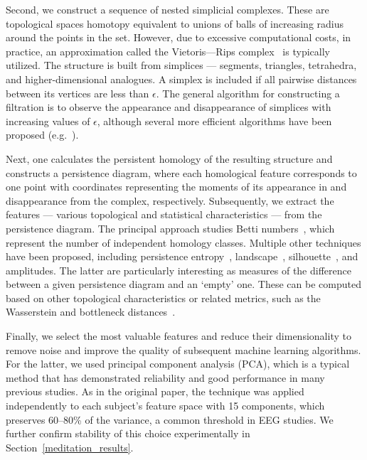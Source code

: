 \documentclass[pdflatex,sn-basic,Numbered]{sn-jnl}
\begin{document}
Second, we construct a sequence of nested simplicial complexes. These are topological spaces homotopy equivalent to unions of balls of increasing radius around the points in the set. However, due to excessive computational costs, in practice, an approximation called the Vietoris---Rips complex~\cite{Vietoris1927} is typically utilized. The structure is built from simplices --- segments, triangles, tetrahedra, and higher-dimensional analogues. A simplex is included if all pairwise distances between its vertices are less than $\epsilon$. The general algorithm for constructing a filtration is to observe the appearance and disappearance of simplices with increasing values of $\epsilon$, although several more efficient algorithms have been proposed (e.g.~\cite{Bauer_2021}).

Next, one calculates the persistent homology of the resulting structure and constructs a persistence diagram, where each homological feature corresponds to one point with coordinates representing the moments of its appearance in and disappearance from the complex, respectively. Subsequently, we extract the features --- various topological and statistical characteristics --- from the persistence diagram. The principal approach studies Betti numbers~\cite{Zomorodian2005}, which represent the number of independent homology classes. Multiple other techniques have been proposed, including persistence entropy~\cite{10.1007/978-3-319-29228-1_11}, landscape~\cite{bubenik2015statisticaltopologicaldataanalysis}, silhouette~\cite{chazal2013stochasticconvergencepersistencelandscapes}, and amplitudes. The latter are particularly interesting as measures of the difference between a given persistence diagram and an `empty' one. These can be computed based on other topological characteristics or related metrics, such as the Wasserstein and bottleneck distances~\cite{Efrat2001}.

Finally, we select the most valuable features and reduce their dimensionality to remove noise and improve the quality of subsequent machine learning algorithms. For the latter, we used principal component analysis (PCA), which is a typical method that has demonstrated reliability and good performance in many previous studies. As in the original paper, the technique was applied independently to each subject's feature space with 15 components, which preserves 60--80\% of the variance, a common threshold in EEG studies. We further confirm stability of this choice experimentally in Section~\ref{meditation_results}.
\end{document}
